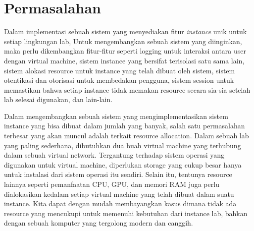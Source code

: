 
\section{Permasalahan}
\label{sec:masalah}
Dalam implementasi sebuah sistem yang menyediakan fitur \textit{instance} unik untuk setiap lingkungan lab, 
Untuk mengembangkan sebuah sistem yang diinginkan, maka perlu dikembangkan fitur-fitur seperti logging untuk interaksi antara user dengan virtual machine,
sistem instance yang bersifat terisolasi satu sama lain, sistem alokasi resource untuk instance yang telah dibuat oleh sistem, sistem otentikasi dan otorisasi untuk membedakan pengguna,
sistem session untuk memastikan bahwa setiap instance tidak memakan resource secara sia-sia setelah lab selesai digunakan, dan lain-lain. 


Dalam mengembangkan sebuah sistem yang mengimplementasikan sistem instance yang bisa dibuat dalam jumlah yang banyak,
salah satu permasalahan terbesar yang akan muncul adalah terkait resource allocation.
Dalam sebuah lab yang paling sederhana, dibutuhkan dua buah virtual machine yang terhubung dalam sebuah virtual network.
Tergantung terhadap sistem operasi yang digunakan untuk virtual machine, diperlukan storage yang cukup besar hanya untuk instalasi dari sistem operasi itu sendiri.
Selain itu, tentunya resource lainnya seperti pemanfaatan CPU, GPU, dan memori RAM juga perlu dialokasikan kedalam setiap virtual machine yang telah dibuat dalam suatu instance.
Kita dapat dengan mudah membayangkan kasus dimana tidak ada resource yang mencukupi untuk memenuhi kebutuhan dari instance lab, bahkan dengan sebuah komputer yang tergolong modern dan canggih.
\par
